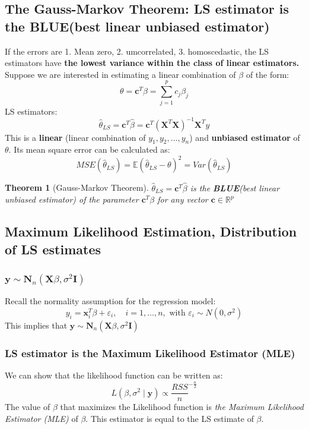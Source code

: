 \documentclass[11pt,a4paper]{article}
\newtheorem{theorem}{Theorem}
\begin{document}
\subsection{The Gauss-Markov Theorem: LS estimator is the \textbf{BLUE}(best linear unbiased estimator)}
If the errors are 1. Mean zero, 2. umcorrelated, 3. homoscedastic, the LS estimators have \textbf{the lowest variance within the class of linear estimators.}\\
Suppose we are interested in estimating a linear combination of $\beta$ of the form:
$$\theta=\mathbf{c}^T\beta=\sum_{j=1}^pc_j\beta_j$$
LS estimators:
$$\hat{\theta}_{LS}=\mathbf{c}^T\hat{\beta}=\mathbf{c}^T \left(\mathbf{X}^{T} \mathbf{X}\right)^{-1} \mathbf{X}^{T} y$$
This is a \textbf{linear} (linear combination of $y_1,y_2,...,y_n$) and \textbf{unbiased estimator} of $\theta$. Its mean square error can be calculated as:
$$
MSE( \hat{\theta}_{LS} ) = \mathbb{E}( \hat{\theta}_{LS} − \theta)^2 = Var( \hat{\theta}_{LS})$$
\begin{theorem}[Gauss-Markov Theorem]
    $\hat{\theta}_{LS}=\mathbf{c}^T\hat{\beta}$ is the \textbf{BLUE}(best linear unbiased estimator) of the parameter $\mathbf{c}^T\beta$ for any vector $\mathbf{c}\in \mathbb{R}^p$
\end{theorem}

\subsection{Maximum Likelihood Estimation, Distribution of LS estimates}
\subsubsection{$\mathbf{y} \sim \mathbf{N}_{n}\left(\mathbf{X} \beta, \sigma^{2} \mathbf{I}\right)$}
Recall the normality assumption for the regression model:
$$
y_{i}=\mathbf{x}_{i}^{T} \beta+\varepsilon_{i},\quad i=1, \ldots, n, \text { with } \varepsilon_{i} \sim N\left(0, \sigma^{2}\right)
$$
This implies that $\mathbf{y} \sim \mathbf{N}_{n}\left(\mathbf{X} \beta, \sigma^{2} \mathbf{I}\right)$
\subsubsection{LS estimator is the Maximum Likelihood Estimator (MLE)}
We can show that the likelihood function can be written as:
$$
L\left(\beta, \sigma^{2} \mid \mathbf{y}\right) \propto \frac{R S S}{n}^{-\frac{n}{2}}
$$
The value of $\beta$ that maximizes the Likelihood function is \textit{the Maximum Likelihood Estimator (MLE)} of $\beta$. This estimator is equal to the LS estimate of $\beta$.
\end{document}
